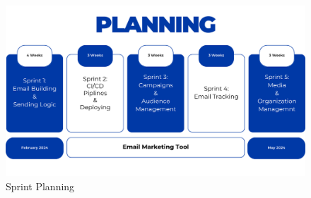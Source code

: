 \begin{figure}[ht]
	\centering
	\includegraphics[width=\linewidth]{Images//images/planning.png}
	\caption{Sprint Planning}
	\label{fig:Sprint Planning}
\end{figure}
